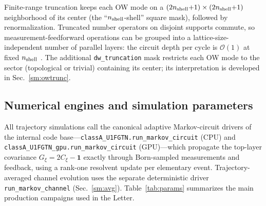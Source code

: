 \documentclass[aps,prl,onecolumn,superscriptaddress,nofootinbib]{revtex4-2}
\newcommand{\Gtraj}{G_{\xi}}
\newcommand{\nsh}{n_{\rm shell}}
\begin{document}
Finite-range truncation keeps each OW mode on a $(2\nsh{+}1)\times(2\nsh{+}1)$ neighborhood of its center (the ``$\nsh$-shell'' square mask), followed by renormalization.  Truncated number operators on disjoint supports commute, so measurement-feedforward operations can be grouped into a lattice-size-independent number of parallel layers: the circuit depth per cycle is $\mathcal{O}(1)$ at fixed $\nsh$ \cite{BhuiyanPanJian2026}.  The additional \texttt{dw\_truncation} mask restricts each OW mode to the sector (topological or trivial) containing its center; its interpretation is developed in Sec.~\ref{sm:owtrunc}.

\subsection{Numerical engines and simulation parameters}

All trajectory simulations call the canonical adaptive Markov-circuit drivers of the internal code base---\texttt{classA\_U1FGTN.run\_markov\_circuit} (CPU) and \texttt{classA\_U1FGTN\_gpu.run\_markov\_circuit} (GPU)---which propagate the top-layer covariance $\Gtraj=2C_\xi-\mathbf{1}$ exactly through Born-sampled measurements and feedback, using a rank-one resolvent update per elementary event.  Trajectory-averaged channel evolution uses the separate deterministic driver \texttt{run\_markov\_channel} (Sec.~\ref{sm:avg}).  Table~\ref{tab:params} summarizes the main production campaigns used in the Letter.
\end{document}
